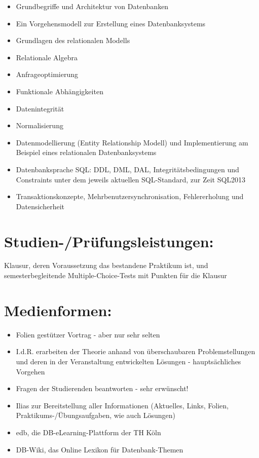 \begin{itemize}
\tightlist
\item
  Grundbegriffe und Architektur von Datenbanken
\item
  Ein Vorgehensmodell zur Erstellung eines Datenbanksystems
\item
  Grundlagen des relationalen Modells
\item
  Relationale Algebra
\item
  Anfrageoptimierung
\item
  Funktionale Abhängigkeiten
\item
  Datenintegrität
\item
  Normalisierung
\item
  Datenmodellierung (Entity Relationship Modell) und Implementierung am
  Beispiel eines relationalen Datenbanksystems
\item
  Datenbanksprache SQL: DDL, DML, DAL, Integritätsbedingungen und
  Constraints unter dem jeweils aktuellen SQL-Standard, zur Zeit SQL2013
\item
  Transaktionskonzepte, Mehrbenutzersynchronisation, Fehlererholung und
  Datensicherheit
\end{itemize}

\section*{Studien-/Prüfungsleistungen:}\label{studien-pruxfcfungsleistungen-6}

Klausur, deren Voraussetzung das bestandene Praktikum ist, und
semesterbegleitende Multiple-Choice-Tests mit Punkten für die Klausur

\section*{Medienformen:}\label{medienformen-4}

\begin{itemize}
\tightlist
\item
  Folien gestützer Vortrag - aber nur sehr selten
\item
  I.d.R. erarbeiten der Theorie anhand von überschaubaren
  Problemstellungen und deren in der Veranstaltung entwickelten Lösungen
  - hauptsächliches Vorgehen
\item
  Fragen der Studierenden beantworten - sehr erwünscht!
\item
  Ilias zur Bereitstellung aller Informationen (Aktuelles, Links,
  Folien, Praktikums-/Übungsaufgaben, wie auch Lösungen)
\item
  edb, die DB-eLearning-Plattform der TH Köln
\item
  DB-Wiki, das Online Lexikon für Datenbank-Themen
\end{itemize}


